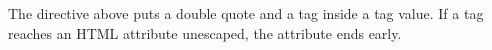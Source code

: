 \begin{lemma}\label{hx-0002}
The directive above puts a double quote and a tag inside a tag value. If a tag reaches an HTML attribute unescaped, the attribute ends early.
\end{lemma}